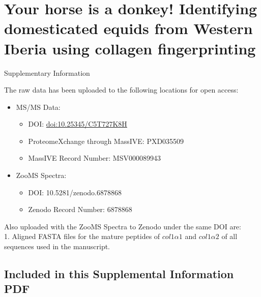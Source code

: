 \documentclass[
]{article}
\author{}
\date{\vspace{-2.5em}}
\providecommand{\tightlist}{%
  \setlength{\itemsep}{0pt}\setlength{\parskip}{0pt}}
\begin{document}
\hypertarget{your-horse-is-a-donkey-identifying-domesticated-equids-from-western-iberia-using-collagen-fingerprinting}{%
\section*{Your horse is a donkey! Identifying domesticated equids from Western Iberia using collagen fingerprinting}\label{your-horse-is-a-donkey-identifying-domesticated-equids-from-western-iberia-using-collagen-fingerprinting}}

\begin{center}
Supplementary Information
\end{center}

The raw data has been uploaded to the following locations for open access:\\

\begin{itemize}
\tightlist
\item
  MS/MS Data:

  \begin{itemize}
  \tightlist
  \item
    DOI: \url{doi:10.25345/C5T727K8H}
  \item
    ProteomeXchange through MassIVE: PXD035509
  \item
    MassIVE Record Number: MSV000089943
  \end{itemize}
\item
  ZooMS Spectra:

  \begin{itemize}
  \tightlist
  \item
    DOI: 10.5281/zenodo.6878868
  \item
    Zenodo Record Number: 6878868
  \end{itemize}
\end{itemize}

Also uploaded with the ZooMS Spectra to Zenodo under the same DOI are:\\
1. Aligned FASTA files for the mature peptides of \(col1 \alpha 1\) and \(col1 \alpha 2\) of all sequences used in the manuscript.

\hypertarget{included-in-this-supplemental-information-pdf}{%
\subsection*{Included in this Supplemental Information PDF}\label{included-in-this-supplemental-information-pdf}}
\end{document}
